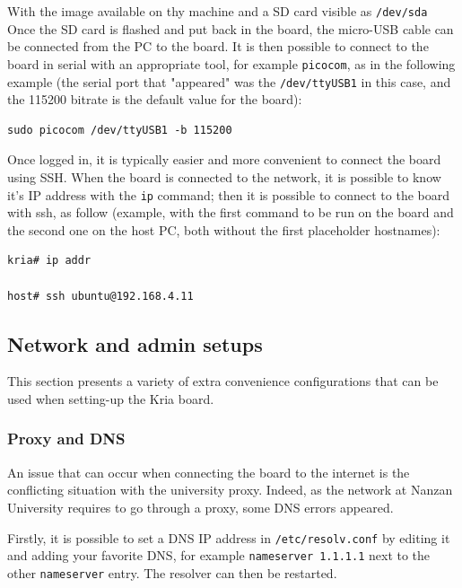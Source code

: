 \documentclass[10pt]{article}
\begin{document}
With the image available on thy machine and a SD card visible as \texttt{/dev/sda}
Once the SD card is flashed and put back in the board, the micro-USB cable can be
connected from the PC to the board. It is then possible to
connect to the board in serial with an appropriate tool, for example \texttt{picocom},
as in the following example (the serial port that "appeared" was the \texttt{/dev/ttyUSB1} in this case,
and the 115200 bitrate is the default value for the board):

\begin{verbatim}
sudo picocom /dev/ttyUSB1 -b 115200
\end{verbatim}

Once logged in, it is typically easier and more convenient to connect the board
using SSH. When the board is connected to the network, it is possible to know
it's IP address with the \texttt{ip} command; then it is possible to connect to
the board with ssh, as follow (example, with the first command to be run on the board
and the second one on the host PC, both without the first placeholder hostnames):


\begin{verbatim}
kria# ip addr

host# ssh ubuntu@192.168.4.11
\end{verbatim}

\subsection{Network and admin setups}
\label{sec:org1037db4}
This section presents a variety of extra convenience configurations
that can be used when setting-up the Kria board.

\subsubsection{Proxy and DNS}
\label{sec:orgbc4ab4b}
An issue that can occur when connecting the board to the internet is the
conflicting situation with the university proxy.
Indeed, as the network at Nanzan University requires to go through a proxy,
some DNS errors appeared.

Firstly, it is possible to set a DNS IP address in \texttt{/etc/resolv.conf} by
editing it and adding your favorite DNS, for example \texttt{nameserver 1.1.1.1}
next to the other \texttt{nameserver} entry. The resolver can then be restarted.
\end{document}
